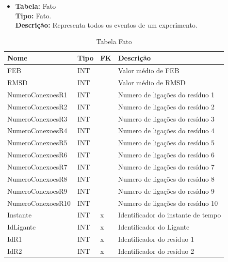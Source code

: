 \begin{itemize}
	\item
		\textbf{Tabela:} Fato \\
		\textbf{Tipo:} Fato. \\
		\textbf{Descrição:} Representa todos os eventos de um experimento.
\end{itemize}
\begin{table}[!htbp]
	\caption{Tabela Fato}
	\centering
	\begin{tabular}{@{}llll@{}}
	\toprule
	\textbf{Nome} & \textbf{Tipo} & \textbf{FK} & \textbf{Descrição}           				\\ \midrule
	FEB            			 & INT        &             & Valor médio de FEB			    \\
	RMSD    				 & INT        &             & Valor médio de RMSD          		\\
	NumeroConexoesR1 	     & INT        &             & Numero de ligações do resíduo 1   \\
	NumeroConexoesR2 	     & INT        &             & Numero de ligações do resíduo 2   \\
	NumeroConexoesR3 	     & INT        &             & Numero de ligações do resíduo 3   \\
	NumeroConexoesR4 	     & INT        &             & Numero de ligações do resíduo 4   \\
	NumeroConexoesR5 	     & INT        &             & Numero de ligações do resíduo 5   \\
	NumeroConexoesR6 	     & INT        &             & Numero de ligações do resíduo 6   \\
	NumeroConexoesR7 	     & INT        &             & Numero de ligações do resíduo 7   \\
	NumeroConexoesR8 	     & INT        &             & Numero de ligações do resíduo 8   \\
	NumeroConexoesR9 	     & INT        &             & Numero de ligações do resíduo 9   \\
	NumeroConexoesR10 	     & INT        &             & Numero de ligações do resíduo 10  \\
	Instante 	    		 & INT        &  x          & Identificador do instante de tempo  \\
	IdLigante 	    		 & INT        &  x          & Identificador do Ligante 			\\
	IdR1 				     & INT        &  x          & Identificador do resíduo 1   	\\
	IdR2 				     & INT        &  x          & Identificador do resíduo 2   	\\

\end{tabular}
\end{table}
